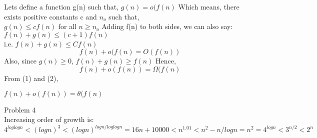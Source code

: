 \documentclass[10pt]{article}
\begin{document}
\setcounter{equation}{0}
Lets define a function g(n) such that, $g(n) = o(f(n)$
Which means, there exists positive constants c and $n_{o}$ such that,\\
$g(n) \leq cf(n)$ for all $n \geq n_{o}$
Adding f(n) to both sides, we can also say: \\
$f(n) + g(n) \leq (c+1)f(n)$\\
i.e. $f(n) + g(n) \leq Cf(n)$
\begin{equation}
f(n) + o(f(n) = O(f(n))
\end{equation}
Also, since $g(n) \geq 0$,
$f(n) + g(n) \geq f(n)$
Hence, 
\begin{equation}
f(n) + o(f(n)) = \Omega(f(n)
\end{equation}
From (1) and (2),
\begin{center}
$f(n) + o(f(n)) = \theta(f(n)$
\end{center}



\newpage
Problem 4\\
Increasing order of growth is:
$4^{loglogn} < (logn)^3 < (logn)^{logn/loglogn} = 16n + 10000 < n^{1.01} < n^2-n/logn = n^2 = 4^{logn} < 3^{n/2} < 2^n $\\
\end{document}
